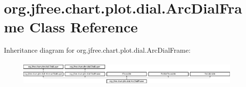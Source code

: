 \hypertarget{classorg_1_1jfree_1_1chart_1_1plot_1_1dial_1_1_arc_dial_frame}{}\section{org.\+jfree.\+chart.\+plot.\+dial.\+Arc\+Dial\+Frame Class Reference}
\label{classorg_1_1jfree_1_1chart_1_1plot_1_1dial_1_1_arc_dial_frame}
Inheritance diagram for org.\+jfree.\+chart.\+plot.\+dial.\+Arc\+Dial\+Frame\+:\begin{figure}[H]
\begin{center}
\leavevmode
\includegraphics[height=1.312500cm]{classorg_1_1jfree_1_1chart_1_1plot_1_1dial_1_1_arc_dial_frame}
\end{center}
\end{figure}
